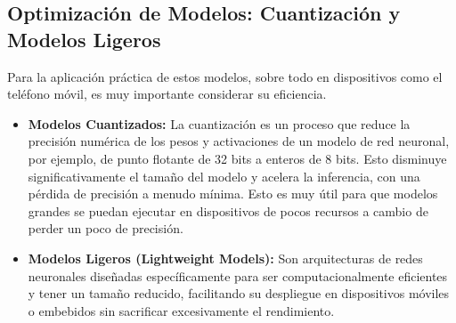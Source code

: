\subsection{Optimización de Modelos: Cuantización y Modelos Ligeros}
Para la aplicación práctica de estos modelos, sobre todo en dispositivos como el teléfono móvil, es muy importante considerar su eficiencia.
\begin{itemize}
    \item \textbf{Modelos Cuantizados:} La cuantización es un proceso que reduce la precisión numérica de los pesos y activaciones de un modelo de red neuronal, por ejemplo, de punto flotante de 32 bits a enteros de 8 bits. Esto disminuye significativamente el tamaño del modelo y acelera la inferencia, con una pérdida de precisión a menudo mínima. Esto es muy útil para que modelos grandes se puedan ejecutar en dispositivos de pocos recursos a cambio de perder un poco de precisión.
    \item \textbf{Modelos Ligeros (Lightweight Models):} Son arquitecturas de redes neuronales diseñadas específicamente para ser computacionalmente eficientes y tener un tamaño reducido, facilitando su despliegue en dispositivos móviles o embebidos sin sacrificar excesivamente el rendimiento.
\end{itemize}

